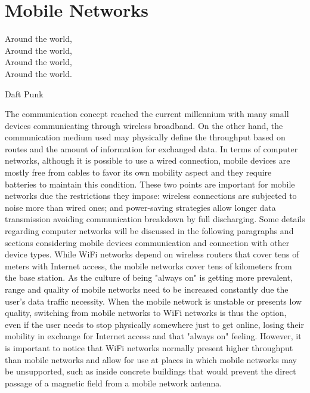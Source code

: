 \chapter{Mobile Networks}
\label{cap:mobilenetworks}

 \epigraph{
 Around the world,\\
 Around the world,\\
 Around the world,\\
 Around the world.}
 {Daft Punk}

The communication concept reached the current millennium with many small devices communicating through wireless broadband.
On the other hand, the communication medium used may physically define the throughput based on routes and the amount of information for exchanged data.
In terms of computer networks, although it is possible to use a wired connection, mobile devices are mostly free from cables to favor its own mobility aspect and they require batteries to maintain this condition.
These two points are important for mobile networks due the restrictions they impose: wireless connections are subjected to noise more than wired ones; and power-saving strategies allow longer data transmission avoiding communication breakdown by full discharging.
Some details regarding computer networks will be discussed in the following paragraphs and sections considering mobile devices communication and connection with other device types. 
While WiFi networks depend on wireless routers that cover tens of meters with Internet access, the mobile networks cover tens of kilometers from the base station.
As the culture of being "always on" is getting more prevalent, range and quality of mobile networks need to be increased constantly due the user's data traffic necessity.
When the mobile network is unstable or presents low quality, switching from mobile networks to WiFi networks is thus the option, even if the user needs to stop physically somewhere just to get online, losing their mobility in exchange for Internet access and that "always on" feeling.
However, it is important to notice that WiFi networks normally present higher throughput than mobile networks and allow for use at places in which mobile networks may be unsupported, such as inside concrete buildings that would prevent the direct passage of a magnetic field from a mobile network antenna.

